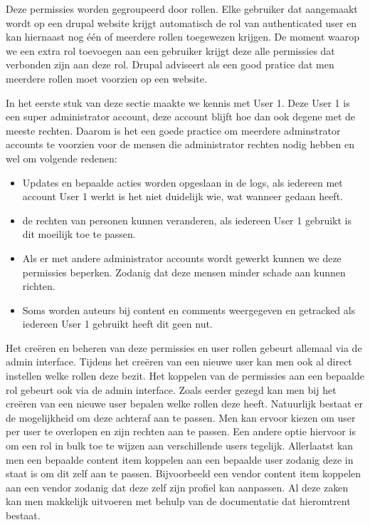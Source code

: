 Deze permissies worden gegroupeerd door rollen. Elke gebruiker dat aangemaakt wordt op een drupal website krijgt automatisch de rol van authenticated user en kan hiernaast nog één of meerdere rollen toegewezen krijgen. De moment waarop we een extra rol toevoegen aan een gebruiker krijgt deze alle permissies dat verbonden zijn aan deze rol. Drupal adviseert als een good pratice dat men meerdere rollen moet voorzien op een website.

In het eerste stuk van deze sectie maakte we kennis met User 1. Deze User 1 is een super administrator account, deze account blijft hoe dan ook degene met de meeste rechten. Daarom is het een goede practice om meerdere adminstrator accounts te voorzien voor de mensen die administrator rechten nodig hebben en wel om volgende redenen:

\begin{itemize}
	\item Updates en bepaalde acties worden opgeslaan in de logs, als iedereen met account User 1 werkt is het niet duidelijk wie, wat wanneer gedaan heeft.
	\item de rechten van personen kunnen veranderen, als iedereen User 1 gebruikt is dit moeilijk toe te passen.
	\item Als er met andere administrator accounts wordt gewerkt kunnen we deze permissies beperken. Zodanig dat deze mensen minder schade aan kunnen richten.
	\item Soms worden auteurs bij content en comments weergegeven en getracked als iedereen User 1 gebruikt heeft dit geen nut.
\end{itemize}
 
Het creëren en beheren van deze permissies en user rollen gebeurt allemaal via de admin interface. Tijdens het creëren van een nieuwe user kan men ook al direct instellen welke rollen deze bezit. Het koppelen van de permissies aan een bepaalde rol gebeurt ook via de admin interface. Zoals eerder gezegd kan men bij het creëren van een nieuwe user bepalen welke rollen deze heeft. Natuurlijk bestaat er de mogelijkheid om deze achteraf aan te passen. Men kan ervoor kiezen om user per user te overlopen en zijn rechten aan te passen. Een andere optie hiervoor is om een rol in bulk toe te wijzen aan verschillende users tegelijk. Allerlaatst kan men een bepaalde content item koppelen aan een bepaalde user zodanig deze in staat is om dit zelf aan te passen. Bijvoorbeeld een vendor content item koppelen aan een vendor  zodanig dat deze zelf zijn profiel kan aanpassen. Al deze zaken kan men makkelijk uitvoeren met behulp van de documentatie dat hieromtrent bestaat.

